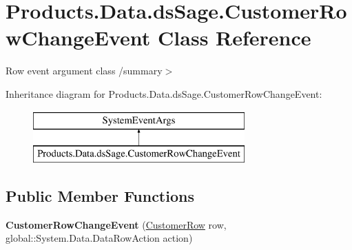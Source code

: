\hypertarget{class_products_1_1_data_1_1ds_sage_1_1_customer_row_change_event}{}\section{Products.\+Data.\+ds\+Sage.\+Customer\+Row\+Change\+Event Class Reference}
\label{class_products_1_1_data_1_1ds_sage_1_1_customer_row_change_event}


Row event argument class /summary$>$  


Inheritance diagram for Products.\+Data.\+ds\+Sage.\+Customer\+Row\+Change\+Event\+:\begin{figure}[H]
\begin{center}
\leavevmode
\includegraphics[height=2.000000cm]{class_products_1_1_data_1_1ds_sage_1_1_customer_row_change_event}
\end{center}
\end{figure}
\subsection*{Public Member Functions}
\begin{DoxyCompactItemize}
\item 
{\bfseries Customer\+Row\+Change\+Event} (\hyperlink{class_products_1_1_data_1_1ds_sage_1_1_customer_row}{Customer\+Row} row, global\+::\+System.\+Data.\+Data\+Row\+Action action)\hypertarget{class_products_1_1_data_1_1ds_sage_1_1_customer_row_change_event_a49487119bb1416d574ea7ed8d19a132c}{}\label{class_products_1_1_data_1_1ds_sage_1_1_customer_row_change_event_a49487119bb1416d574ea7ed8d19a132c}

\end{DoxyCompactItemize}
